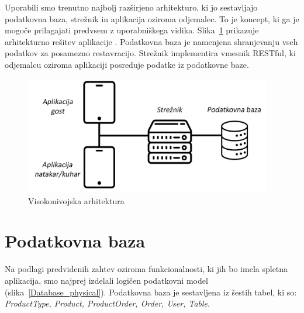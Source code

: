 \documentclass[a4paper, 12pt]{book}
\begin{document}
Uporabili smo trenutno najbolj razširjeno arhitekturo, ki jo sestavljajo podatkovna baza, strežnik in aplikacija oziroma odjemalec. To je koncept, ki ga je mogoče prilagajati predvsem z uporabniškega vidika. Slika~\ref{StrukApk} prikazuje arhitekturno rešitev aplikacije \cite{TRINIVO}.
Podatkovna baza je namenjena shranjevanju vseh podatkov za posamezno restavracijo. Strežnik implementira vmesnik RESTful, ki odjemalcu oziroma aplikaciji posreduje podatke iz podatkovne baze. 

\begin{figure}[!htb]
\centering
\includegraphics[width=10.8cm]{Skica1-new.png}
\caption{Visokonivojska arhitektura}
\label{StrukApk}
\end{figure}


\section{Podatkovna baza}
Na podlagi predvidenih zahtev oziroma funkcionalnosti, ki jih bo imela spletna aplikacija, smo najprej izdelali logičen podatkovni model (slika~\ref{Database_physical}). Podatkovna baza je sestavljena iz šestih tabel, ki so: \textit{ProductType, Product, ProductOrder, Order, User, Table}. 
\end{document}
